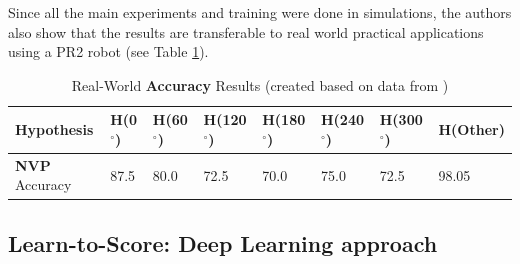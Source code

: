 \documentclass[a4paper,11pt,english]{article}
\begin{document}
Since all the main experiments and training were done in simulations, the authors also show that the results are transferable to real world practical applications using a PR2 robot (see Table \ref{tbl:atanasovrealevaluation2}). 

\begin{table}[t!]
  \caption{Real-World \textbf{Accuracy} Results (created based on data from \cite{atanasov2014nonmyopic})}
  \label{tbl:atanasovrealevaluation2}
  \begin{adjustbox}{width=\columnwidth,center}
  \begin{tabular}{|l|l|l|l|l|l|l|l|}
  \hline
   Hypothesis & H(0$^\circ$)& H(60$^\circ$) & H(120$^\circ$) & H(180$^\circ$) & H(240$^\circ$) & H(300$^\circ$) & H(Other)\\
   \hline
  \textbf{NVP} Accuracy & 87.5 & 80.0 & 72.5 & 70.0 & 75.0 & 72.5 & 98.05 \\
  \hline
\end{tabular}
\end{adjustbox}
\end{table}





\subsection{Learn-to-Score: Deep Learning approach}
\end{document}

